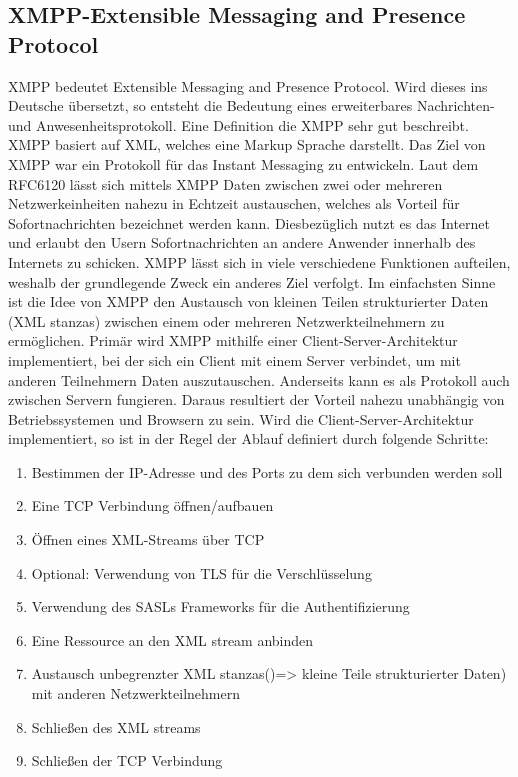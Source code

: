\documentclass[a4paper,titlepage,halfparskip,12pt]{scrreprt}
\begin{document}
\begin{onehalfspacing}
\section{XMPP-Extensible Messaging and Presence Protocol}
\label{sec:XMPP}
\ac{XMPP} bedeutet Extensible Messaging and Presence Protocol. Wird dieses ins Deutsche übersetzt, so entsteht die Bedeutung eines erweiterbares Nachrichten- und Anwesenheitsprotokoll. Eine Definition die \ac{XMPP} sehr gut beschreibt. \ac{XMPP} basiert auf \ac{XML}, welches eine Markup Sprache darstellt. Das Ziel von \ac{XMPP} war ein Protokoll für das Instant Messaging zu entwickeln. Laut dem RFC6120 lässt sich mittels \ac{XMPP} Daten zwischen zwei oder mehreren Netzwerkeinheiten nahezu in Echtzeit austauschen, welches als Vorteil für Sofortnachrichten bezeichnet werden kann. Diesbezüglich nutzt es das Internet und erlaubt den Usern Sofortnachrichten an andere Anwender innerhalb des Internets zu schicken. \ac{XMPP} lässt sich in viele verschiedene Funktionen aufteilen, weshalb der grundlegende Zweck ein anderes Ziel verfolgt. Im einfachsten Sinne ist die Idee von \ac{XMPP} den Austausch von kleinen Teilen strukturierter Daten (\glqq \ac{XML} stanzas\grqq) zwischen einem oder mehreren Netzwerkteilnehmern zu ermöglichen. Primär wird \ac{XMPP} mithilfe einer Client-Server-Architektur implementiert, bei der sich ein Client mit einem Server verbindet, um mit anderen Teilnehmern Daten auszutauschen. Anderseits kann es als Protokoll auch zwischen Servern fungieren. Daraus resultiert der Vorteil nahezu unabhängig von Betriebssystemen und Browsern zu sein. Wird die Client-Server-Architektur implementiert, so ist in der Regel der Ablauf definiert durch folgende Schritte: \cite{RFC6120} 
\begin{enumerate}
	\item Bestimmen der IP-Adresse und des Ports zu dem sich verbunden werden soll 
	\item Eine \ac{TCP} Verbindung öffnen/aufbauen
	\item Öffnen eines \ac{XML}-Streams über \ac{TCP}
	\item Optional: Verwendung von \ac{TLS} für die Verschlüsselung
	\item Verwendung des SASLs Frameworks für die Authentifizierung
	\item Eine Ressource an den \ac{XML} stream anbinden
	\item Austausch unbegrenzter \glqq \ac{XML} stanzas\grqq ()=> kleine Teile strukturierter Daten) mit anderen Netzwerkteilnehmern
	\item Schließen des \ac{XML} streams
	\item Schließen der \ac{TCP} Verbindung
\end{enumerate}


\end{onehalfspacing}
\end{document}
